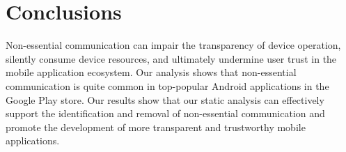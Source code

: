 \vspace{-0.1in}
\section{Conclusions}
\label{sec:conclusions}

Non-essential communication can impair the transparency of device
operation, silently consume device resources, and ultimately undermine
user trust in the mobile application ecosystem. Our analysis shows
that non-essential communication is quite common in 
top-popular Android applications in the Google Play store. 
Our results show that our static analysis can effectively 
support the identification and removal of
non-essential communication and promote the development of more
transparent and trustworthy mobile applications. 
